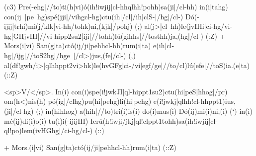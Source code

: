 (c3) Pre(-ehg|//to)ti(h|vi)ó(ih!iwjij|cl-hhqlhh!pohh)sa(ji|/cl-hh) 
in(i|tahg) con(ij~|pe~hg)spé(jji|/vihgcl-hg)ctu(ih|/cl|/ih|clS-|/hg|/cl-) Dó(-ijij|trhi)mi(j/klk|vi-hh/tohk)ni,(kjk|/pohj) (;) 
al(j>|cl~hh)le(jvIHi|ci-hg/vi-hg|GHjvIH|//vi-hipp2su2|iji|//tohh)lú(gihhs|//tosthh)ja,(hg|/cl-) (:Z) 
+ 
Mors(i|vi) San(g|ta)ctó(ij/ji|pehhcl-hh)rum(i|ta) e(ih|cl-hg|/ijg|//toS2hg|/hge~|/cl>)jus,(fe|/cl-) (,) 
al(df!gwh/i>|qlhhppt2vi>hk)le(hvGFg|ci-/vi|egf/ge|//to/cl)lú(efe|//toS)ia.(e|ta) (::Z)

<sp>V/</sp>. 
In(i) con(i)spe(i!jwkJI|ql-hippt1su2)ctu(hi|peS|hhog|/pr) om(h<)nis(h) pó(ig|/clhg)pu(hi|pehg)li(hi|pehg) e(i!jwkj|qlhh!cl-hhppt1)ius,(ji|/cl-hg) (;) 
in(hihhog) a(hih|//to)tri(i)is(i) do(i)mus(i) Dó(ij)mi(i)ni,(i) (`) in(i) mé(ij)di(i)o(i) tu(i)i(-ijijIH) Ierú(h!iwji/jkj|ql!clppt1tohh)sa(ih!iwjij|cl-ql!po)lem(ivHGhg|/ci-hg/cl-) (::)

+ 
Mors.(i|vi) San(g|ta)ctó(ij/ji|pehhcl-hh)rum(i|ta) (::Z)
